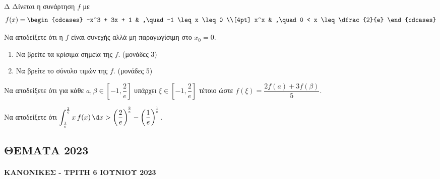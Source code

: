 \begin{thema}{Δ}
Δίνεται η συνάρτηση $f$ με
\[
f(x) =
\begin{cdcases}
-x^3 + 3x + 1 & ,\quad -1 \leq x \leq 0 \\[4pt]
x^x & ,\quad 0 < x \leq \dfrac{2}{e}
\end{cdcases}
\]
\begin{erwthma}
    \item Να αποδείξετε ότι η $f$ είναι συνεχής αλλά μη παραγωγίσιμη στο $x_0 = 0$. 

    \item
    \begin{enumerate}[label=\roman*.]
        \item Να βρείτε τα κρίσιμα σημεία της $f$. \hfill (μονάδες 3)
        \item Να βρείτε το σύνολο τιμών της $f$. \hfill (μονάδες 5)
    \end{enumerate}

    \item Να αποδείξετε ότι για κάθε $a, \beta \in \left[-1, \dfrac{2}{e}\right]$ υπάρχει $\xi \in \left[-1, \dfrac{2}{e}\right]$ τέτοιο ώστε $f(\xi) = \dfrac{2f(a) + 3f(\beta)}{5}$. 

    \item Να αποδείξετε ότι $\displaystyle\int_{\frac{1}{e}}^{\frac{2}{e}} x\,f(x)\,\d x > \left(\frac{2}{e}\right)^{\!\frac{2}{e}} - \left(\frac{1}{e}\right)^{\!\frac{1}{e}}$. 
\end{erwthma}
\end{thema}


\subsection{ΘΕΜΑΤΑ 2023}
\paragraph{ΚΑΝΟΝΙΚΕΣ - ΤΡΙΤΗ 6 ΙΟΥΝΙΟΥ 2023}

